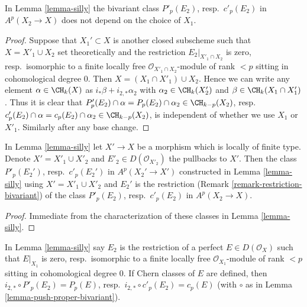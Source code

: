 \begin{lemma}
\label{lemma-silly-independent}
In Lemma \ref{lemma-silly} the bivariant class
$P'_p(E_2)$, resp.\ $c'_p(E_2)$ in $A^p(X_2 \to X)$
does not depend on the choice of $X_1$.
\end{lemma}

\begin{proof}
Suppose that $X_1' \subset X$ is another closed subscheme such that
$X = X'_1 \cup X_2$ set theoretically and the restriction
$E_2|_{X'_1 \cap X_2}$ is zero, resp.\ isomorphic to a
finite locally free $\mathcal{O}_{X'_1 \cap X_2}$-module
of rank $< p$ sitting in cohomological degree $0$.
Then $X = (X_1 \cap X'_1) \cup X_2$. Hence we can write
any element $\alpha \in \CH_k(X)$ as $i_*\beta + i_{2, *}\alpha_2$ with
$\alpha_2 \in \CH_k(X'_2)$ and $\beta \in \CH_k(X_1 \cap X'_1)$.
Thus it is clear that
$P'_p(E_2) \cap \alpha = P_p(E_2) \cap \alpha_2 \in \CH_{k - p}(X_2)$,
resp.\  $c'_p(E_2) \cap \alpha = c_p(E_2) \cap \alpha_2 \in \CH_{k - p}(X_2)$,
is independent of whether we use $X_1$ or $X'_1$. Similarly
after any base change.
\end{proof}

\begin{lemma}
\label{lemma-base-change-silly}
In Lemma \ref{lemma-silly} let $X' \to X$ be a morphism
which is locally of finite type. Denote $X' = X'_1 \cup X'_2$
and $E'_2 \in D(\mathcal{O}_{X'_2})$ the pullbacks to $X'$.
Then the class $P'_p(E_2')$, resp.\ $c'_p(E_2')$ in
$A^p(X_2' \to X')$ constructed in Lemma \ref{lemma-silly} using
$X' = X'_1 \cup X'_2$ and $E_2'$ is the restriction
(Remark \ref{remark-restriction-bivariant})
of the class $P'_p(E_2)$, resp.\ $c'_p(E_2)$ in $A^p(X_2 \to X)$.
\end{lemma}

\begin{proof}
Immediate from the characterization of these classes in
Lemma \ref{lemma-silly}.
\end{proof}

\begin{lemma}
\label{lemma-silly-silly}
In Lemma \ref{lemma-silly} say $E_2$ is the restriction of a
perfect $E \in D(\mathcal{O}_X)$ such that $E|_{X_1}$ is zero,
resp.\ isomorphic to a finite locally free $\mathcal{O}_{X_1}$-module
of rank $< p$ sitting in cohomological degree $0$.
If Chern classes of $E$ are defined, then
$i_{2, *} \circ P'_p(E_2) = P_p(E)$,
resp.\ $i_{2, *} \circ c'_p(E_2) = c_p(E)$
(with $\circ$ as in Lemma \ref{lemma-push-proper-bivariant}).
\end{lemma}

